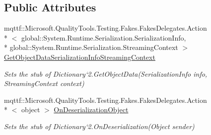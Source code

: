 \subsection*{Public Attributes}
\begin{DoxyCompactItemize}
\item 
mqttf\-::\-Microsoft.\-Quality\-Tools.\-Testing.\-Fakes.\-Fakes\-Delegates.\-Action\\*
$<$ global\-::\-System.\-Runtime.\-Serialization.\-Serialization\-Info, \\*
global\-::\-System.\-Runtime.\-Serialization.\-Streaming\-Context $>$ \hyperlink{class_system_1_1_collections_1_1_generic_1_1_fakes_1_1_stub_dictionary_3_01_t_key_00_01_t_value_01_4_a269083d0904c52178f87d530a5ff2210}{Get\-Object\-Data\-Serialization\-Info\-Streaming\-Context}
\begin{DoxyCompactList}\small\item\em Sets the stub of Dictionary`2.Get\-Object\-Data(\-Serialization\-Info info, Streaming\-Context context)\end{DoxyCompactList}\item 
mqttf\-::\-Microsoft.\-Quality\-Tools.\-Testing.\-Fakes.\-Fakes\-Delegates.\-Action\\*
$<$ object $>$ \hyperlink{class_system_1_1_collections_1_1_generic_1_1_fakes_1_1_stub_dictionary_3_01_t_key_00_01_t_value_01_4_ae66028322954caf4376bee7d28263532}{On\-Deserialization\-Object}
\begin{DoxyCompactList}\small\item\em Sets the stub of Dictionary`2.On\-Deserialization(\-Object sender)\end{DoxyCompactList}\end{DoxyCompactItemize}
